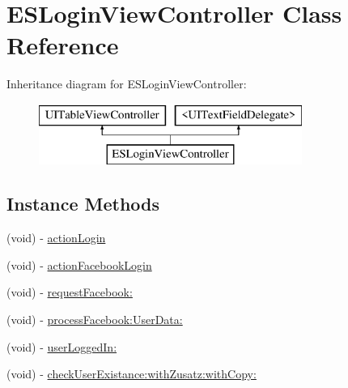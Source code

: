 \hypertarget{interface_e_s_login_view_controller}{}\section{E\+S\+Login\+View\+Controller Class Reference}
\label{interface_e_s_login_view_controller}
Inheritance diagram for E\+S\+Login\+View\+Controller\+:\begin{figure}[H]
\begin{center}
\leavevmode
\includegraphics[height=2.000000cm]{interface_e_s_login_view_controller}
\end{center}
\end{figure}
\subsection*{Instance Methods}
\begin{DoxyCompactItemize}
\item 
(void) -\/ \hyperlink{interface_e_s_login_view_controller_a6022bab534ccd69eee337ee6bb326c05}{action\+Login}
\item 
(void) -\/ \hyperlink{interface_e_s_login_view_controller_a65da63b4653ce202f4a89cfef4291781}{action\+Facebook\+Login}
\item 
(void) -\/ \hyperlink{interface_e_s_login_view_controller_a8899150c612177688bede195cb1da45f}{request\+Facebook\+:}
\item 
(void) -\/ \hyperlink{interface_e_s_login_view_controller_aaae39a10fc9b375e0bbc99c032002f78}{process\+Facebook\+:\+User\+Data\+:}
\item 
(void) -\/ \hyperlink{interface_e_s_login_view_controller_a042a0f0194894b05946b466f6f9e358c}{user\+Logged\+In\+:}
\item 
(void) -\/ \hyperlink{interface_e_s_login_view_controller_a244e68f96410a50424ff04d869e506cd}{check\+User\+Existance\+:with\+Zusatz\+:with\+Copy\+:}
\end{DoxyCompactItemize}
